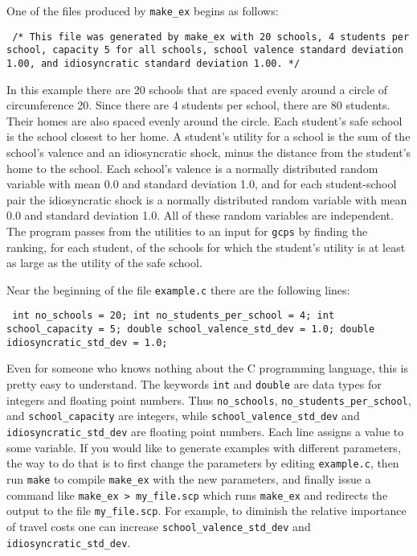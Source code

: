 \documentclass[12pt]{article}
\theoremstyle{definition}
\begin{document}
One of the files produced by \texttt{make\_ex} begins as follows:
\begin{obeylines}\texttt{
    /* This file was generated by make\_ex with 20 schools,
    4 students per school, capacity 5 for all schools,
    school valence standard deviation 1.00,
    and idiosyncratic standard deviation 1.00. */
}
\end{obeylines} \noindent
In this example there are 20 schools that are spaced evenly around a
circle of circumference 20.  Since there are 4 students per school,
there are 80 students.  Their homes are also spaced evenly around the
circle.  Each student's safe school is the school closest to her home.
A student's utility for a school is the sum of the school's valence
and an idiosyncratic shock, minus the distance from the student's home
to the school.  Each school's valence is a normally distributed random
variable with mean 0.0 and standard deviation 1.0, and for each
student-school pair the idiosyncratic shock is a normally distributed
random variable with mean 0.0 and standard deviation 1.0.  All of
these random variables are independent.  The program passes from the
utilities to an input for \texttt{gcps} by finding the ranking, for
each student, of the schools for which the student's utility is at
least as large as the utility of the safe school.

Near the beginning of the file \texttt{example.c} there are the following lines:
\begin{obeylines}\texttt{
  int no\_schools = 20;
  int no\_students\_per\_school = 4;
  int school\_capacity = 5;
  double school\_valence\_std\_dev = 1.0;
  double idiosyncratic\_std\_dev = 1.0;
}
\end{obeylines} \noindent
Even for someone who knows nothing about the C programming language,
this is pretty easy to understand.  The keywords \texttt{int} and
\texttt{double} are data types for integers and floating point
numbers.  Thus \texttt{no\_schools},
\texttt{no\_students\_per\_school}, and \texttt{school\_capacity} are
integers, while \texttt{school\_valence\_std\_dev} and
\texttt{idiosyncratic\_std\_dev} are floating point numbers.  Each
line assigns a value to some variable.  If you would like to generate
examples with different parameters, the way to do that is to first
change the parameters by editing \texttt{example.c}, then run
\texttt{make} to compile \texttt{make\_ex} with the new parameters,
and finally issue a command like \texttt{make\_ex > my\_file.scp}
which runs \texttt{make\_ex} and redirects the output to the file
\texttt{my\_file.scp}.  For example, to diminish the relative
importance of travel costs one can increase
\texttt{school\_valence\_std\_dev} and
\texttt{idiosyncratic\_std\_dev}.
\end{document}
